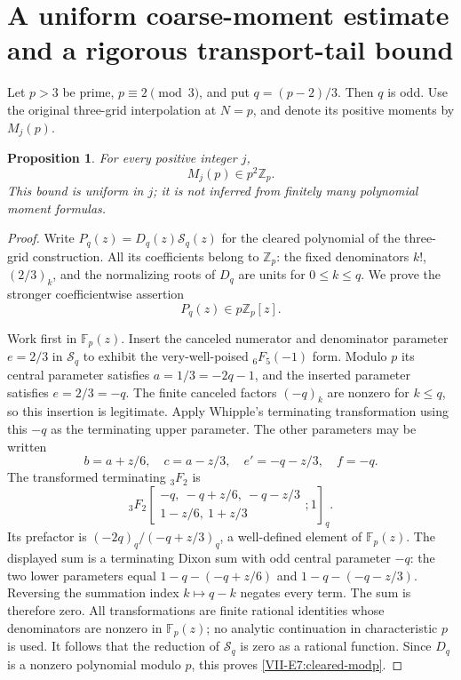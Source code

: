\documentclass[11pt,letterpaper]{article}
\newtheorem{proposition}[theorem]{Proposition}
\numberwithin{equation}{section}
\begin{document}
\section{A uniform coarse-moment estimate and a rigorous transport-tail bound}\label{loc-VII-17}
\label{VII-sec:E7coarsemoments}
Let $p>3$ be prime, $p\equiv2\pmod3$, and put $q=(p-2)/3$.
Then $q$ is odd. Use the original three-grid interpolation at
$N=p$, and denote its positive moments by $M_j(p)$.

\begin{proposition}\label{VII-E7:all-coarse-moments}
For every positive integer $j$,
\[
 \boxed{M_j(p)\in p^2\mathbb Z_p.}
\]
This bound is uniform in $j$; it is not inferred from finitely many
polynomial moment formulas.
\end{proposition}
\begin{proof}
Write $P_q(z)=D_q(z)\mathcal S_q(z)$ for the cleared polynomial
of the three-grid construction. All its coefficients belong to
$\mathbb Z_p$: the fixed denominators $k!$, $(2/3)_k$, and the
normalizing roots of $D_q$ are units for $0\le k\le q$.
We prove the stronger coefficientwise assertion
\begin{equation}\label{VII-E7:cleared-modp}
 P_q(z)\in p\mathbb Z_p[z].
\end{equation}

Work first in $\mathbb F_p(z)$. Insert the canceled numerator and
denominator parameter $e=2/3$ in $\mathcal S_q$ to exhibit the
very-well-poised ${}_6F_5(-1)$ form.
Modulo $p$ its central parameter satisfies
$a=1/3=-2q-1$, and the inserted parameter satisfies $e=2/3=-q$.
The finite canceled factors $(-q)_k$ are nonzero for $k\le q$,
so this insertion is legitimate.
Apply Whipple's terminating transformation using this $-q$ as the
terminating upper parameter. The other parameters may be written
\[
 b=a+z/6,\quad c=a-z/3,\quad e'=-q-z/3,\quad f=-q.
\]
The transformed terminating ${}_3F_2$ is
\[
 {}_3F_2\left[\begin{matrix}
 -q,\ -q+z/6,\ -q-z/3\\1-z/6,\ 1+z/3
 \end{matrix};1\right]_q.
\]
Its prefactor is $(-2q)_q/(-q+z/3)_q$, a well-defined element of
$\mathbb F_p(z)$. The displayed sum is a terminating Dixon sum
with odd central parameter $-q$: the two lower parameters equal
$1-q-(-q+z/6)$ and $1-q-(-q-z/3)$.
Reversing the summation index $k\mapsto q-k$ negates every term.
The sum is therefore zero. All transformations are finite rational
identities whose denominators are nonzero in $\mathbb F_p(z)$;
no analytic continuation in characteristic $p$ is used.
It follows that the reduction of $\mathcal S_q$ is zero as a
rational function. Since $D_q$ is a nonzero polynomial modulo $p$,
this proves \eqref{VII-E7:cleared-modp}.


\end{proof}
\end{document}
